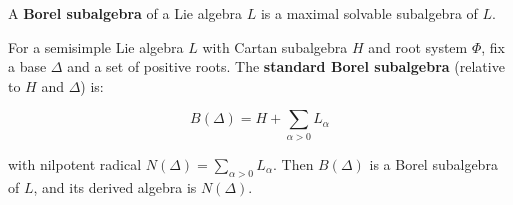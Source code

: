 A \textbf{Borel subalgebra} of a Lie algebra $L$ is a maximal solvable subalgebra of $L$.

For a semisimple Lie algebra $L$ with Cartan subalgebra $H$ and root system $\Phi$, fix a base $\Delta$ and a set of positive roots. The \textbf{standard Borel subalgebra} (relative to $H$ and $\Delta$) is:

$$B(\Delta) = H + \sum_{\alpha > 0} L_{\alpha}$$

with nilpotent radical $N(\Delta) = \sum_{\alpha > 0} L_{\alpha}$. Then $B(\Delta)$ is a Borel subalgebra of $L$, and its derived algebra is $N(\Delta)$.
